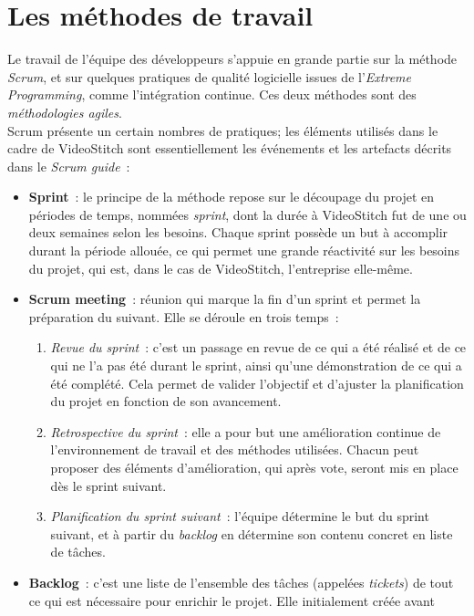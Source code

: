 \section{Les méthodes de travail}
Le travail de l'équipe des développeurs s'appuie en grande partie sur la méthode \emph{Scrum}, et
sur quelques pratiques de qualité logicielle issues de l'\textit{Extreme Programming}, comme l'intégration continue.
Ces deux méthodes sont des \emph{méthodologies agiles}\cite{methode-agile}.\\
\newline
Scrum présente un certain nombres de pratiques; les éléments utilisés 
dans le cadre de VideoStitch sont essentiellement les événements et les artefacts 
décrits dans le \textit{Scrum guide}\cite{scrum-guide}~:
\begin{itemize}
  \item \textbf{Sprint}~: le principe de la méthode repose sur le découpage du projet en 
	périodes de temps, nommées \emph{sprint}, dont la durée à VideoStitch fut de 
	une ou deux semaines selon les besoins. Chaque sprint possède un but à accomplir 
	durant la période allouée, ce qui permet une grande réactivité sur les besoins 
	du projet, qui est, dans le cas de VideoStitch, l'entreprise elle-même.
	\item \textbf{Scrum meeting}~: réunion qui marque la fin d'un sprint et permet la préparation 
	du suivant. Elle se déroule en trois temps~:
	\begin{enumerate}
		\item \textit{Revue du sprint}~: c'est un passage en revue de ce qui a été réalisé
		et de ce qui ne l'a pas été durant le sprint, ainsi qu'une démonstration 
		de ce qui a été complété. Cela permet de valider l'objectif et d'ajuster 
		la planification du projet en fonction de son avancement.
		\item \textit{Retrospective du sprint}~: elle a pour but une amélioration continue 
		de l'environnement de travail et des méthodes utilisées. Chacun peut proposer
		des éléments d'amélioration, qui après vote, seront mis en place dès le sprint
		suivant.
		\item \textit{Planification du sprint suivant}~: l'équipe détermine le but du sprint
		suivant, et à partir du \textit{backlog} en détermine son contenu concret en liste de tâches.
	\end{enumerate}
  \item \textbf{Backlog}~: c'est une liste de l'ensemble des tâches (appelées \emph{tickets})
  de tout ce qui est nécessaire pour enrichir le projet. Elle initialement créée avant

\end{itemize}
